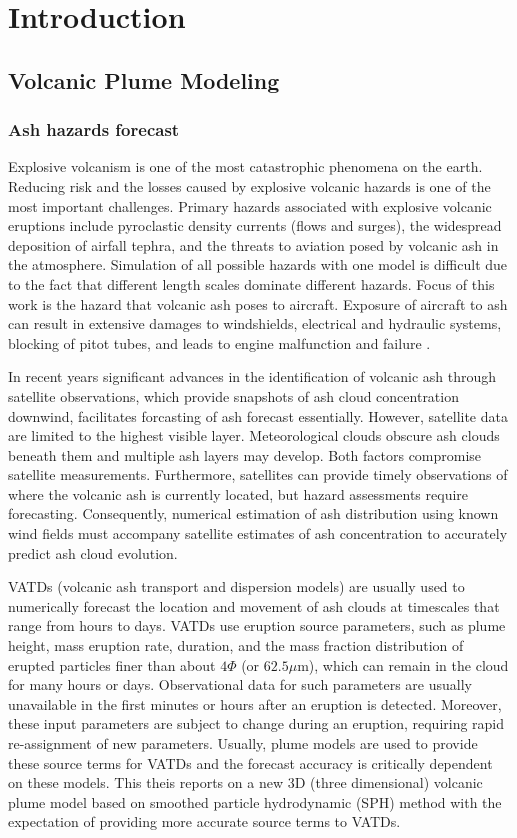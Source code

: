 \chapter{Introduction} \label{chapter:introduction}

\section{Volcanic Plume Modeling}
\subsection{Ash hazards forecast}
Explosive volcanism is one of the most catastrophic
phenomena on the earth.
Reducing risk and the losses caused by explosive volcanic hazards is one of the most important challenges.
Primary hazards associated with explosive volcanic eruptions include pyroclastic density currents (flows and surges), the widespread deposition of airfall tephra, and the threats to aviation posed by volcanic ash in the atmosphere. Simulation of all possible hazards with one model is difficult due to the fact that different length scales dominate different hazards. Focus of this work is the hazard that volcanic ash poses to aircraft. Exposure of
aircraft to ash can result in extensive damages to windshields,
electrical and hydraulic systems, blocking of pitot tubes, and
leads to engine malfunction and failure \citep{peterson2008forecasting}.

In recent years significant advances in
the identification of volcanic ash through satellite observations, which provide snapshots of ash cloud concentration downwind, facilitates forcasting of ash forecast essentially.
However, satellite data are limited to the highest visible layer. Meteorological clouds obscure ash clouds beneath them and multiple ash layers may develop. Both factors compromise satellite measurements.
Furthermore, satellites can provide timely observations of
where the volcanic ash is currently located, but hazard assessments
require forecasting. Consequently, numerical estimation
of ash distribution using known wind fields must
accompany satellite estimates of ash concentration to accurately predict ash cloud evolution.

VATDs (volcanic ash transport and dispersion models) are usually used to numerically forecast the location and movement of ash clouds at timescales that range from hours to days. VATDs use eruption source parameters, such as plume height, mass eruption rate, duration, and the mass fraction distribution of erupted particles finer than about $4 \Phi$ (or $62.5 \mu$m), which can remain in the cloud for many hours or days. Observational data for such parameters are usually unavailable in the first minutes or hours after an eruption is detected. Moreover, these input parameters are subject to change during an eruption, requiring rapid re-assignment of new parameters. Usually, plume models are used to provide these source terms for VATDs and the forecast accuracy is critically dependent on these models. This theis reports on a new 3D (three dimensional) volcanic plume model based on smoothed particle hydrodynamic (SPH) method with the expectation of providing more accurate source terms to VATDs.

